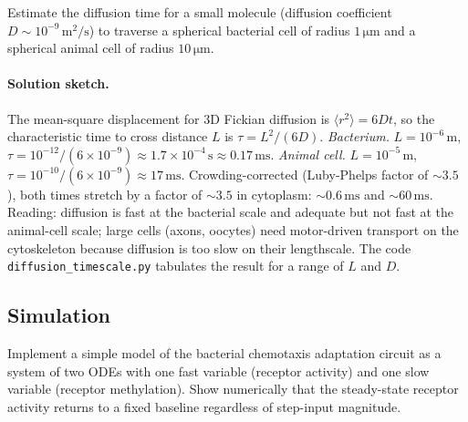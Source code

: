\begin{exercise}
Estimate the diffusion time for a small molecule (diffusion
coefficient $D \sim 10^{-9}\,\text{m}^2/\text{s}$) to traverse a
spherical bacterial cell of radius $1\,\si{\micro\meter}$ and a
spherical animal cell of radius $10\,\si{\micro\meter}$.
\end{exercise}

\paragraph{Solution sketch.}
The mean-square displacement for 3D Fickian diffusion is
$\langle r^2 \rangle = 6Dt$, so the characteristic time to cross
distance $L$ is $\tau = L^2/(6D)$.
\emph{Bacterium.} $L = 10^{-6}\,\text{m}$,
$\tau = 10^{-12}/(6 \times 10^{-9}) \approx 1.7 \times 10^{-4}\,\text{s}
\approx 0.17\,\text{ms}$.
\emph{Animal cell.} $L = 10^{-5}\,\text{m}$,
$\tau = 10^{-10}/(6 \times 10^{-9}) \approx 17\,\text{ms}$.
Crowding-corrected (Luby-Phelps factor of $\sim 3.5$
\cite{paper:v6c01-luby-phelps-2000}), both times stretch by a factor
of $\sim 3.5$ in cytoplasm: $\sim 0.6\,\text{ms}$ and $\sim 60\,\text{ms}$.
Reading: diffusion is fast at the bacterial scale and adequate but
not fast at the animal-cell scale; large cells (axons, oocytes) need
motor-driven transport on the cytoskeleton because diffusion is too
slow on their lengthscale. The code
\texttt{diffusion\_timescale.py} tabulates the result for a range
of $L$ and $D$.

\subsection*{Simulation}

\begin{exercise}
Implement a simple model of the bacterial chemotaxis adaptation
circuit as a system of two ODEs with one fast variable (receptor
activity) and one slow variable (receptor methylation). Show
numerically that the steady-state receptor activity returns to a
fixed baseline regardless of step-input magnitude.
\end{exercise}

